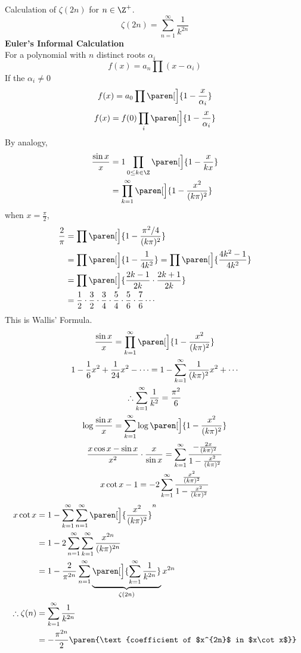 Calculation of $\zeta(2n)$ for $n\in\Z^+$.
\[ \zeta(2n) = \sum_{n=1}^\infty \frac{1}{k^{2n}} \]
\textbf{Euler's Informal Calculation} \\
For a polynomial with $n$ distinct roots $\alpha_i$
\[ f(x) = a_n \prod (x-\alpha_i) \]
If the $\alpha_i\neq0$
\[ f(x) = a_0 \prod\paren[\Big]{1-\frac{x}{\alpha_i}} \]
\[ f(x) = f(0) \prod_i\paren[\Big]{1-\frac{x}{\alpha_i}} \]
By analogy,
\begin{align*}
\frac{\sin x}{x} &= 1 \prod_{0\leq k\in\Z}\paren[\Big]{1-\frac{x}{kx}} \\
&= \prod_{k=1}^\infty \paren[\Big]{1-\frac{x^2}{(k\pi)^2}}
\end{align*}
\eg when $x=\frac\pi2$,
\begin{align*}
\frac2\pi &= \prod\paren[\Big]{1-\frac{\pi^2/4}{(k\pi)^2}} \\
&= \prod\paren[\Big]{1-\frac{1}{4k^2}} = \prod\paren[\Big]{\frac{4k^2-1}{4k^2}} \\
&= \prod\paren[\Big]{\frac{2k-1}{2k}\cdot\frac{2k+1}{2k}} \\
&= \frac12\cdot\frac32\cdot\frac34\cdot\frac54\cdot\frac56\cdot\frac76\dotsm
\end{align*}
This is Wallis' Formula.
\begin{gather*}
\frac{\sin x}{x} = \prod_{k=1}^\infty\paren[\Big]{1-\frac{x^2}{(k\pi)^2}} \\
1 - \frac16x^2 + \frac1{24}x^2 - \dotsb = 1 - \sum_{k=1}^\infty\frac1{(k\pi)^2}x^2 + \dotsb \\
\therefore \sum_{k=1}^\infty \frac{1}{k^2} = \frac{\pi^2}{6} \\
\log\frac{\sin x}{x} = \sum_{k=1}^\infty\log\paren[\Big]{1-\frac{x^2}{(k\pi)^2}} \\
\frac{x\cos x-\sin x}{x^2}\cdot\frac{x}{\sin x} = \sum_{k=1}^\infty\frac{-\frac{2x}{(k\pi)^2}}{1-\frac{x^2}{(k\pi)^2}} \\
x\cot x - 1 = -2\sum_{k=1}^\infty \frac{\frac{x^2}{(k\pi)^2}}{1-\frac{x^2}{(k\pi)^2}}
\end{gather*}
\begin{align*}
x\cot x &= 1 - \sum_{k=1}^\infty\sum_{n=1}^\infty\paren[\Big]{\frac{x^2}{(k\pi)^2}}^n \\
&= 1 - 2\sum_{n=1}^\infty \sum_{k=1}^\infty \frac{x^{2n}}{(k\pi)^{2n}} \\
&= 1 - \frac{2}{\pi^{2n}} \sum_{n=1}^\infty \underbrace{\paren[\Big]{\sum_{k=1}^\infty\frac{1}{k^{2n}}}}_{\zeta(2n)} x^{2n} \\
\therefore \zeta(n) &= \sum_{k=1}^\infty \frac1{k^{2n}} \\
&= -\frac{\pi^{2n}}{2}\paren{\text{coefficient of $x^{2n}$ in $x\cot x$}}
\end{align*}
